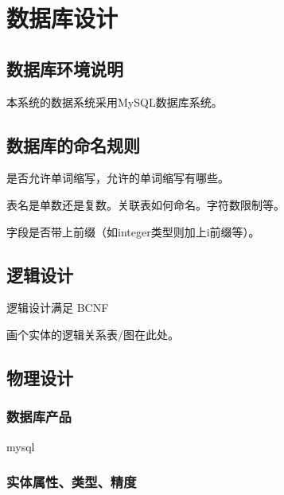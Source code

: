 \chapter{数据库设计}
\section{数据库环境说明}


本系统的数据系统采用MySQL数据库系统。

\section{数据库的命名规则}
是否允许单词缩写，允许的单词缩写有哪些。

表名是单数还是复数。关联表如何命名。字符数限制等。

字段是否带上前缀（如integer类型则加上i前缀等）。

\section{逻辑设计}
逻辑设计满足 BCNF

画个实体的逻辑关系表/图在此处。

\section{物理设计}
\subsection{数据库产品}
mysql

\subsection{实体属性、类型、精度}
